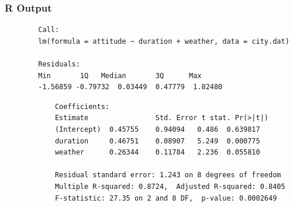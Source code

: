 \documentclass[14pt]{beamer}
\begin{document}
\begin{frame}[fragile]
	\frametitle{R Output}
	{\footnotesize
	\begin{verbatim}
		Call:
		lm(formula = attitude ~ duration + weather, data = city.dat)
		
		Residuals:
		Min       1Q   Median       3Q      Max 
		-1.56859 -0.79732  0.03449  0.47779  1.82480 
	\end{verbatim}
	{\color{red}
		\begin{verbatim}
			Coefficients:
			Estimate                Std. Error t stat. Pr(>|t|)
			(Intercept)  0.45755    0.94094   0.486  0.639817
			duration     0.46751    0.08907   5.249  0.000775
			weather      0.26344    0.11784   2.236  0.055810
			
			Residual standard error: 1.243 on 8 degrees of freedom
			Multiple R-squared: 0.8724,  Adjusted R-squared: 0.8405
			F-statistic: 27.35 on 2 and 8 DF,  p-value: 0.0002649
		\end{verbatim}
	}}
	
\end{frame}
\end{document}
